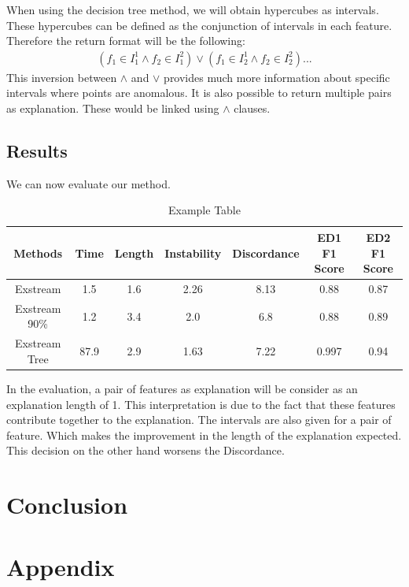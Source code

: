 \documentclass[oneside, a4paper, onecolumn, 11pt]{article}
\begin{document}
When using the decision tree method, we will obtain hypercubes as intervals. These hypercubes can be defined as the conjunction of intervals in each feature. Therefore the return format will be the following: 
\begin{align*}
  (f_1 \in I^1_1 \land f_2 \in I^2_1) \lor (f_1 \in I^1_2 \land f_2 \in I^2_2) ...
\end{align*}
This inversion between $\land$ and $\lor$ provides much more information about specific intervals where points are anomalous. It is also possible to return multiple pairs as explanation. These would be linked using $\land$ clauses.
\subsection{Results}
We can now evaluate our method.
\begin{table}[h]
  \centering
  \begin{tabular}{|c|c|c|c|c|c|c|}
      \hline
      Methods & Time & Length & Instability & Discordance & ED1 F1 Score & ED2 F1 Score\\ 
      \hline
      Exstream  & 1.5  & 1.6  & 2.26  & 8.13 & 0.88 & 0.87  \\ 
      Exstream 90\%  & 1.2  & 3.4  & 2.0  & 6.8 & 0.88 & 0.89\\ 
      Exstream Tree  & 87.9  & 2.9  & 1.63 & 7.22 & 0.997 & 0.94 \\ 
      \hline
  \end{tabular}
  \caption{Example Table}
  \label{tab:example}
\end{table}
In the evaluation, a pair of features as explanation will be consider as an explanation length of 1. This interpretation is due to the fact that these features contribute together to the explanation. The intervals are also given for a pair of feature. Which makes the improvement in the length of the explanation expected. This decision on the other hand worsens the Discordance.

\section{Conclusion}

\newpage



\newpage
\appendix

\section{Appendix}
\label{sec:appendix}
\end{document}
